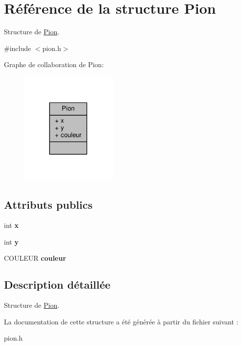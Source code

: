 \hypertarget{structPion}{}\section{Référence de la structure Pion}
\label{structPion}


Structure de \hyperlink{structPion}{Pion}.  




{\ttfamily \#include $<$pion.\+h$>$}



Graphe de collaboration de Pion\+:\nopagebreak
\begin{figure}[H]
\begin{center}
\leavevmode
\includegraphics[width=137pt]{structPion__coll__graph}
\end{center}
\end{figure}
\subsection*{Attributs publics}
\begin{DoxyCompactItemize}
\item 
int {\bfseries x}\hypertarget{structPion_af6505c8de5ccc06d564945534272694c}{}\label{structPion_af6505c8de5ccc06d564945534272694c}

\item 
int {\bfseries y}\hypertarget{structPion_aa7fb8d98415132074045e4aebf7d97dd}{}\label{structPion_aa7fb8d98415132074045e4aebf7d97dd}

\item 
C\+O\+U\+L\+E\+UR {\bfseries couleur}\hypertarget{structPion_a1bb174054b197226d0c44f4a2920e409}{}\label{structPion_a1bb174054b197226d0c44f4a2920e409}

\end{DoxyCompactItemize}


\subsection{Description détaillée}
Structure de \hyperlink{structPion}{Pion}. 

La documentation de cette structure a été générée à partir du fichier suivant \+:\begin{DoxyCompactItemize}
\item 
pion.\+h\end{DoxyCompactItemize}
